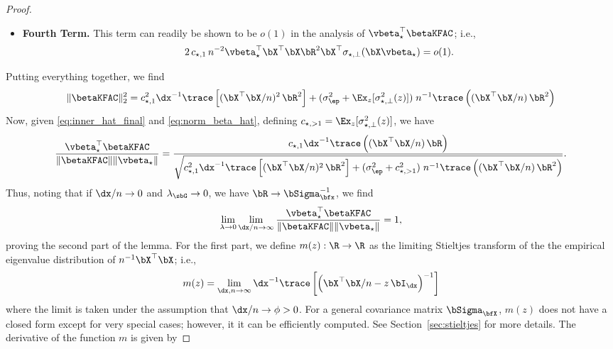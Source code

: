 \begin{proof}
\begin{itemize}
        \item \textbf{Fourth Term.} This term can readily be shown to be $o(1)$ in the analysis of $\vbeta_\star^\top \betaKFAC$; i.e.,
        \begin{align*}
        2\, c_{\star, 1} \, n^{-2} \vbeta_\star^\top \bX^\top  \bX \bR^2 \bX^\top\sigma_{\star,\perp}(\bX\vbeta_\star) = o(1).
        \end{align*}
    \end{itemize}
    Putting everything together, we find
    \begin{align}
        \label{eq:norm_beta_hat}
        \|\betaKFAC\|_2^2 = c_{\star, 1}^2  \dx^{-1}   \trace \left[(\bX^\top\bX/n)^2\,\bR^2\right] + (\sigma_\ep^2 + \Ex_z[\sigma^2_{\star,\perp}(z)]) \; n^{-1} \trace\left((\bX^\top\bX/n)\,\bR^2\right) 
    \end{align}
    Now, given \eqref{eq:inner_hat_final} and \eqref{eq:norm_beta_hat}, defining $c_{\star,>1} = \Ex_z[\sigma^2_{\star,\perp}(z)]$, we have
    \begin{align}
        \label{eq:hat_corr_prelim}
        \frac{\vbeta_\star^\top\betaKFAC}{\|\betaKFAC\| \|\vbeta_\star\|}= \frac{c_{\star,1} \dx^{-1} \trace\left((\bX^\top\bX/n)\,\bR\right) }{\sqrt{c_{\star, 1}^2  \dx^{-1}   \trace \left[(\bX^\top\bX/n)^2\,\bR^2\right] + (\sigma_\ep^2 + c^2_{\star,>1}) \; n^{-1} \trace\left((\bX^\top\bX/n)\,\bR^2\right) }}.
    \end{align}
    Thus, noting that if $\dx/n\to 0$ and $\lambda_\sbG \to 0$, we have $\bR \to \bSigma_\bfx^{-1}$, we find
    \begin{align*}
        \lim_{\lambda\to 0} \lim_{\dx/n \to \infty}\frac{\vbeta_\star^\top\betaKFAC}{\|\betaKFAC\| \|\vbeta_\star\|} = 1,
    \end{align*}
    proving the second part of the lemma. For the first part, we define $m(z):\R \to \R$ as the limiting Stieltjes transform of the the empirical eigenvalue distribution of $n^{-1} \bX^\top\bX$; i.e.,
    \begin{align}
    \label{eq:stieltjes}
        m(z) =  \lim_{\dx, n\to \infty} \dx^{-1} \trace\left[\left(\bX^\top\bX/n - z \,\bI_{\dx}\right)^{-1}\right]
    \end{align}
    where the limit is taken under the assumption that $\dx/n \to \phi>0$. For a general covariance matrix $\bSigma_{\bfX}$, $m(z)$ does not have a closed form except for very special cases; however, it it can be
 efficiently computed. See Section~\ref{sec:stieltjes} for more details. The derivative of the function $m$ is given by

\end{proof}
